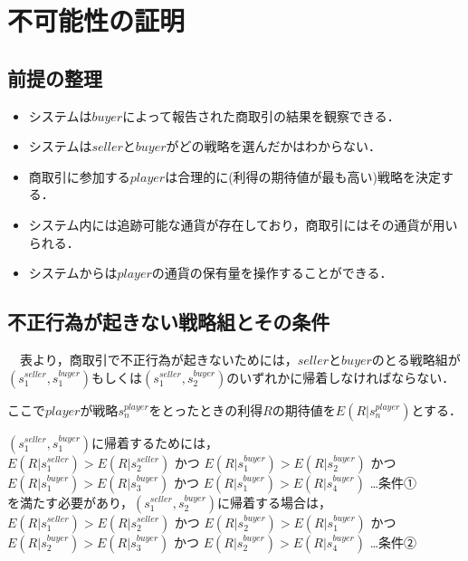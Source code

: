\section{不可能性の証明}
\subsection{前提の整理}
  \begin{itemize}
    \item システムは$buyer$によって報告された商取引の結果を観察できる．
    \item システムは$seller$と$buyer$がどの戦略を選んだかはわからない．
    \item 商取引に参加する$player$は合理的に(利得の期待値が最も高い)戦略を決定する．
    \item システム内には追跡可能な通貨が存在しており，商取引にはその通貨が用いられる．
    \item システムからは$player$の通貨の保有量を操作することができる．
  \end{itemize}

\subsection{不正行為が起きない戦略組とその条件}
　表より，商取引で不正行為が起きないためには，$seller$と$buyer$のとる戦略組が$ (s^{seller}_1, s^{buyer}_1)$もしくは$(s^{seller}_1, s^{buyer}_2)$のいずれかに帰着しなければならない．

  ここで$player$が戦略$s^{player}_n$をとったときの利得$R$の期待値を$E(R|s^{player}_n)$とする．

  $(s^{seller}_1, s^{buyer}_1)$に帰着するためには，\\

  $E(R|s^{seller}_1)>E(R|s^{seller}_2)$
  かつ
  $E(R|s^{buyer}_1)>E(R|s^{buyer}_2)$
  かつ
  $E(R|s^{buyer}_1)>E(R|s^{buyer}_3)$
  かつ
  $E(R|s^{buyer}_1)>E(R|s^{buyer}_4)$ …条件①\\

  を満たす必要があり，$(s^{seller}_1, s^{buyer}_2)$に帰着する場合は，\\

  $E(R|s^{seller}_1)>E(R|s^{seller}_2)$
  かつ
  $E(R|s^{buyer}_2)>E(R|s^{buyer}_1)$
  かつ
  $E(R|s^{buyer}_2) > E(R|s^{buyer}_3)$
  かつ
  $E(R|s^{buyer}_2) > E(R|s^{buyer}_4)$ …条件②\\

